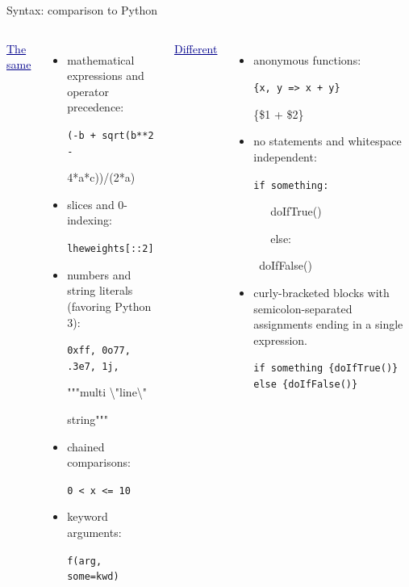 \documentclass{beamer}
\begin{document}
\begin{frame}[fragile]{Syntax: comparison to Python}
\vspace{0.3 cm}
\begin{columns}[t]
\textcolor{darkblue}{\underline{The same}}
\begin{itemize}
\item mathematical expressions and operator precedence:

{\small\tt (-b + sqrt(b**2 -

\hfill 4*a*c))/(2*a)}

\item slices and 0-indexing:

{\small\tt lheweights[::2]}

\item numbers and string literals (favoring Python 3):

{\small\tt 0xff, 0o77, .3e7, 1j,

"""multi \textbackslash"line\textbackslash"

string"""}

\item chained comparisons:

{\small\tt 0 < x <= 10}

\item keyword arguments:

{\small\tt f(arg, some=kwd)}

\end{itemize}

\textcolor{darkblue}{\underline{Different}}
\begin{itemize}
\item anonymous functions:

{\small\tt \{x, y => x + y\}

\{\$1 + \$2\}}

\item no statements and whitespace independent:

{\small\tt if something:

\ \ \ doIfTrue()

\ \ \ else:

\ doIfFalse()}

\item curly-bracketed blocks with semicolon-separated assignments ending in a single expression.

{\small\tt if something \{doIfTrue()\} else \{doIfFalse()\}}
\end{itemize}
\end{columns}
\end{frame}
\end{document}
